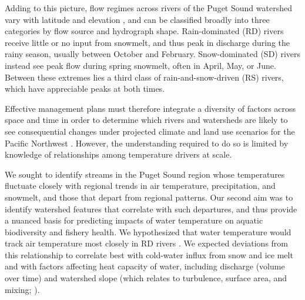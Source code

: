 \documentclass[notitlepage]{article}
\begin{document}
Adding to this picture, flow regimes across rivers of the Puget Sound watershed vary with latitude and elevation \citep{reidy2012hydrogeomorphic,mauger2015CIG}, and can be classified broadly into three categories by flow source and hydrograph shape. Rain-dominated (RD) rivers receive little or no input from snowmelt, and thus peak in discharge during the rainy season, usually between October and February. Snow-dominated (SD) rivers instead see peak flow during spring snowmelt, often in April, May, or June. Between these extremes lies a third class of rain-and-snow-driven (RS) rivers, which have appreciable peaks at both times.

Effective management plans must therefore integrate a diversity of factors across space and time in order to determine which rivers and watersheds are likely to see consequential changes under projected climate and land use scenarios for the Pacific Northwest \citep{mote2010future,radeloff2012economic}. However, the understanding required to do so is limited by knowledge of relationships among temperature drivers at scale.


We sought to identify streams in the Puget Sound region whose temperatures fluctuate closely with regional trends in air temperature, precipitation, and snowmelt, and those that depart from regional patterns. Our second aim was to identify watershed features that correlate with such departures, and thus provide a nuanced basis for predicting impacts of water temperature on aquatic biodiversity and fishery health. We hypothesized that water temperature would track air temperature most closely in RD rivers \citep{ward1985thermal,garner2014river}. We expected deviations from this relationship to correlate best with cold-water influx from snow and ice melt \citep{lisi2015watershed} and with factors affecting heat capacity of water, including discharge (volume over time) and watershed slope (which relates to turbulence, surface area, and mixing; \citealt{van2013global}).

\end{document}
